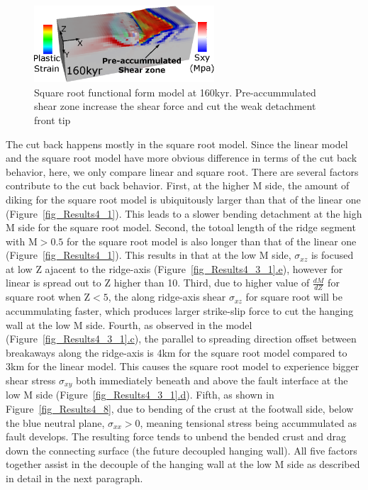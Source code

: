 \begin{figure}[hc]
  \centering
    \includegraphics[width=0.6\textwidth]{fig_Results4_5_sqrt_cut_back_pre_accummulated_shear_zone.eps}
  \caption{Square root functional form model at 160kyr. Pre-accummulated shear zone increase the shear force and cut the weak detachment front tip}
 \label{fig_Results4_5}
\end{figure}   

The cut back happens mostly in the square root model. Since the linear model and the square root model have more obvious difference in terms of the cut back behavior, here, we only compare linear and square root. There are several factors contribute to the cut back behavior. First, at the higher M side, the amount of diking for the square root model is ubiquitously larger than that of the linear one (Figure~\hyperref[fig_Results4_1]{\ref{fig_Results4_1}}). This leads to a slower bending detachment at the high M side for the square root model. Second, the totoal length of the ridge segment with M$>0.5$ for the square root model is also longer than that of the linear one (Figure~\hyperref[fig_Results4_1]{\ref{fig_Results4_1}}). This results in that at the low M side, $\sigma_{xz}$ is focused at low Z ajacent to the ridge-axis (Figure~\hyperref[fig_Results4_3_1]{\ref{fig_Results4_3_1}.e}), however for linear is spread out to Z higher than 10. Third, due to higher value of $\frac{dM}{dZ}$ for square root when Z$<5$, the along ridge-axis shear $\sigma_{xz}$ for square root will be accummulating faster, which produces larger strike-slip force to cut the hanging wall at the low M side. Fourth, as observed in the model (Figure~\hyperref[fig_Results4_3_1]{\ref{fig_Results4_3_1}.c}), the parallel to spreading direction offset between breakaways along the ridge-axis is 4km for the square root model compared to 3km for the linear model. This causes the square root model to experience bigger shear stress $\sigma_{xy}$ both immediately beneath and above the fault interface at the low M side (Figure~\hyperref[fig_Results4_3_1]{\ref{fig_Results4_3_1}.d}). Fifth, as shown in Figure~\hyperref[fig_Results4_8]{\ref{fig_Results4_8}}, due to bending of the crust at the footwall side, below the blue neutral plane, $\sigma_{xx}>0$, meaning tensional stress being accummulated as fault develops. The resulting force tends to unbend the bended crust and drag down the connecting surface (the future decoupled hanging wall). All five factors together assist in the decouple of the hanging wall at the low M side as described in detail in the next paragraph.

